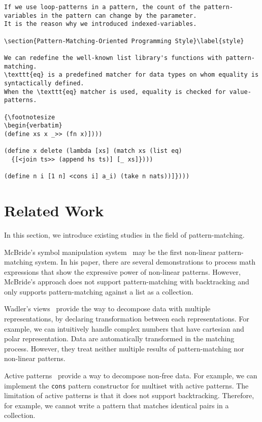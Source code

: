 \documentclass{article}
\begin{document}
\begin{multicols}{2}
{\begin{verbatim}
If we use loop-patterns in a pattern, the count of the pattern-variables in the pattern can change by the parameter.
It is the reason why we introduced indexed-variables.

\section{Pattern-Matching-Oriented Programming Style}\label{style}

We can redefine the well-known list library's functions with pattern-matching.
\texttt{eq} is a predefined matcher for data types on whom equality is syntactically defined.
When the \texttt{eq} matcher is used, equality is checked for value-patterns.

{\footnotesize
\begin{verbatim}
(define xs x _>> (fn x)])))

(define x delete (lambda [xs] (match xs (list eq)
  {[<join ts>> (append hs ts)] [_ xs]})))

(define n i [1 n] <cons i] a_i) (take n nats))]})))
\end{verbatim}
}

\section{Related Work}\label{related}

In this section, we introduce existing studies in the field of pattern-matching.

McBride's symbol manipulation system~\cite{mcbride1970symbol} may be the first non-linear pattern-matching system.
In his paper, there are several demonstrations to process math expressions that show the expressive power of non-linear patterns.
However, McBride's approach does not support pattern-matching with backtracking and only supports pattern-matching against a list as a collection.

Wadler's views~\cite{wadler1987views} provide the way to decompose data with multiple representations, by declaring transformation between each representations.
For example, we can intuitively handle complex numbers that have cartesian and polar representation.
Data are automatically transformed in the matching process.
However, they treat neither multiple results of pattern-matching nor non-linear patterns.

Active patterns~\cite{erwig1996active} provide a way to decompose non-free data.
For example, we can implement the \texttt{cons} pattern constructor for multiset with active patterns.
The limitation of active patterns is that it does not support backtracking.
Therefore, for example, we cannot write a pattern that matches identical pairs in a collection.


\end{multicols}
\end{document}
